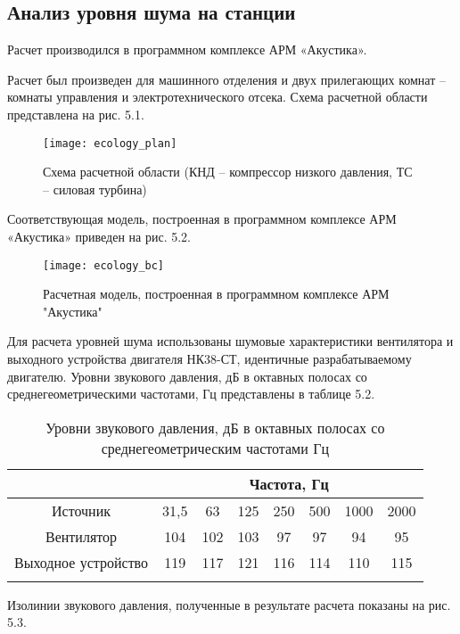 \subsection{Анализ уровня шума на станции} %
\label{sub:ecology_noise_analisys}

Расчет производился в программном комплексе АРМ «Акустика».

Расчет был произведен для машинного отделения и двух прилегающих комнат – комнаты управления и электротехнического отсека. Схема расчетной области представлена на рис. 5.1. 

\begin{figure}[H]
	\centering
	\texttt{[image: ecology\_plan]}
	\caption{Схема расчетной области (КНД – компрессор низкого давления, ТС – силовая турбина)}
\end{figure}

Соответствующая модель, построенная в программном комплексе АРМ «Акустика» приведен на рис. 5.2.

\begin{figure}[H]
	\centering
	\texttt{[image: ecology\_bc]}
	\caption{Расчетная модель, построенная в программном комплексе АРМ "Акустика"}
\end{figure}

Для расчета уровней шума использованы шумовые характеристики вентилятора и выходного устройства двигателя НК38-СТ, идентичные разрабатываемому двигателю. Уровни звукового давления, дБ в октавных полосах со среднегеометрическими частотами, Гц  представлены в таблице 5.2.

\begin{samepage}
\begin{longtable}{|c|c|c|c|c|c|c|c|}
    \hline
    \multicolumn{1}{|c}{}& \multicolumn{7}{c|}{Частота, Гц} \\ \hline
    Источник & 31,5 & 63 & 125 & 250 & 500 & 1000 & 2000 \\ \hline
	Вентилятор & 104 & 102 & 103 & 97 & 97 & 94 & 95 \\ \hline
	Выходное устройство & 119 & 117 & 121 & 116 & 114 & 110 & 115 \\ \hline    
    \caption{Уровни звукового давления, дБ в октавных полосах со среднегеометрическим частотами Гц} \label{tab:ecology_noise_power}
\end{longtable}
\end{samepage}

Изолинии звукового давления, полученные в результате расчета показаны на рис. 5.3.

